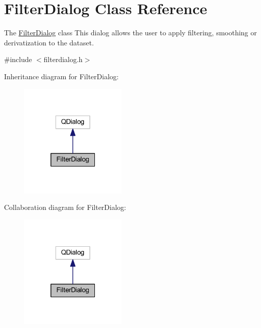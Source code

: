 \hypertarget{class_filter_dialog}{\section{Filter\+Dialog Class Reference}
\label{class_filter_dialog}
}


The \hyperlink{class_filter_dialog}{Filter\+Dialog} class This dialog allows the user to apply filtering, smoothing or derivatization to the dataset.  




{\ttfamily \#include $<$filterdialog.\+h$>$}



Inheritance diagram for Filter\+Dialog\+:\nopagebreak
\begin{figure}[H]
\begin{center}
\leavevmode
\includegraphics[width=145pt]{class_filter_dialog__inherit__graph}
\end{center}
\end{figure}


Collaboration diagram for Filter\+Dialog\+:\nopagebreak
\begin{figure}[H]
\begin{center}
\leavevmode
\includegraphics[width=145pt]{class_filter_dialog__coll__graph}
\end{center}
\end{figure}
